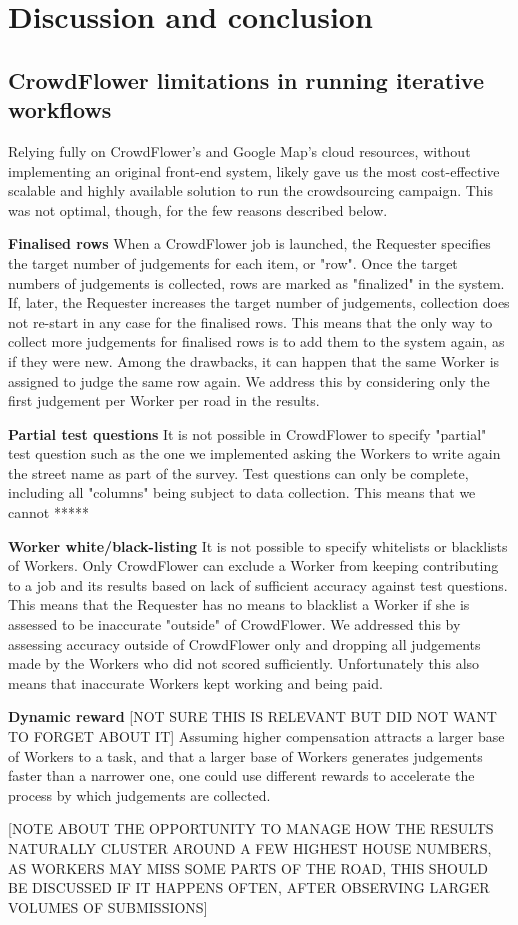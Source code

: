 \section{Discussion and conclusion}

\subsection{CrowdFlower limitations in running iterative workflows}

Relying fully on CrowdFlower's and Google Map's cloud resources, without implementing an original front-end system, likely gave us the most cost-effective scalable and highly available solution to run the crowdsourcing campaign. This was not optimal, though, for the few reasons described below. 

\textbf{Finalised rows} When a CrowdFlower job is launched, the Requester specifies the target number of judgements for each item, or "row". Once the target numbers of judgements is collected, rows are marked as "finalized" in the system. If, later, the Requester increases the target number of judgements, collection does not re-start in any case for the finalised rows. This means that the only way to collect more judgements for finalised rows is to add them to the system again, as if they were new. Among the drawbacks, it can happen that the same Worker is assigned to judge the same row again. We address this by considering only the first judgement per Worker per road in the results.

\textbf{Partial test questions} It is not possible in CrowdFlower to specify "partial" test question such as the one we implemented asking the Workers to write again the street name as part of the survey. Test questions can only be complete, including all "columns" being subject to data collection. This means that we cannot *****  

\textbf{Worker white/black-listing} It is not possible to specify whitelists or blacklists of Workers. Only CrowdFlower can exclude a Worker from keeping contributing to a job and its results based on lack of sufficient accuracy against test questions. This means that the Requester has no means to blacklist a Worker if she is assessed to be inaccurate "outside" of CrowdFlower. We addressed this by assessing accuracy outside of CrowdFlower only and dropping all judgements made by the Workers who did not scored sufficiently. Unfortunately this also means that inaccurate Workers kept working and being paid.

\textbf{Dynamic reward} [NOT SURE THIS IS RELEVANT BUT DID NOT WANT TO FORGET ABOUT IT] Assuming higher compensation attracts a larger base of Workers to a task, and that a larger base of Workers generates judgements faster than a narrower one, one could use different rewards to accelerate the process by which judgements are collected.

[NOTE ABOUT THE OPPORTUNITY TO MANAGE HOW THE RESULTS NATURALLY CLUSTER AROUND A FEW HIGHEST HOUSE NUMBERS, AS WORKERS MAY MISS SOME PARTS OF THE ROAD, THIS SHOULD BE DISCUSSED IF IT HAPPENS OFTEN, AFTER OBSERVING LARGER VOLUMES OF SUBMISSIONS]